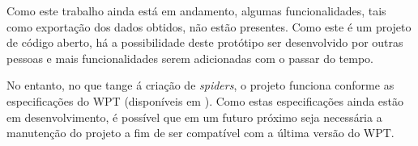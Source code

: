 Como este trabalho ainda está em andamento, algumas funcionalidades, tais como exportação dos dados obtidos, não estão presentes. Como este é um projeto de código aberto, há a possibilidade deste protótipo ser desenvolvido por outras pessoas e mais funcionalidades serem adicionadas com o passar do tempo.

No entanto, no que tange á criação de \emph{spiders}, o projeto funciona conforme as especificações do WPT (disponíveis em \cite{wpt}). Como estas especificações ainda estão em desenvolvimento, é possível que em um futuro próximo seja necessária a manutenção do projeto a fim de ser compatível com a última versão do WPT.